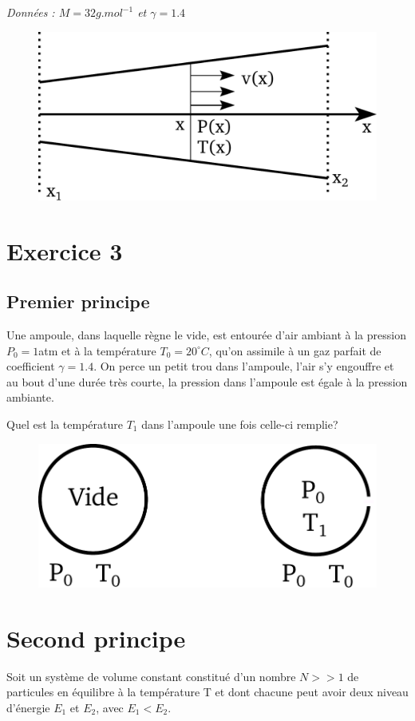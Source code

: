 \documentclass{report}
\begin{document}
\textit{Données : $M = 32g.mol^{-1}$ et $\gamma=1.4$}

\begin{figure}[!h]
\centering
\includegraphics[width=0.4\linewidth]{turbine.pdf}
\end{figure}

\newpage

\section*{Exercice 3}

\subsection*{Premier principe}

Une ampoule, dans laquelle règne le vide, est entourée d'air ambiant à la pression $P_{0} = 1$atm et à la température $T_{0}=20^{\circ}C$, qu'on assimile à un gaz parfait de coefficient $\gamma=1.4$. On perce un petit trou dans l'ampoule, l'air s'y engouffre et au bout d'une durée très courte, la pression dans l'ampoule est égale à la pression ambiante.

Quel est la température $T_{1}$ dans l'ampoule une fois celle-ci remplie?

\begin{figure}[!h]
\centering
\includegraphics[width=0.5\linewidth]{ampoule.pdf}
\end{figure}

\section*{Second principe}

Soit un système de volume constant constitué d'un nombre $N>>1$ de particules en équilibre à la température T et dont chacune peut avoir deux niveau d'énergie $E_{1}$ et $E_{2}$, avec $E_{1}<E_{2}$.
\end{document}
